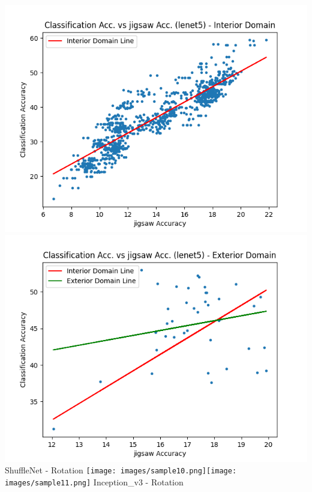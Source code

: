 \documentclass[a4paper]{article}
\begin{document}
{\begin{flushleft}
    \includegraphics[scale=0.16]{images/sample8.png}\includegraphics[scale=0.16]{images/sample9.png}
    ShuffleNet - Rotation
    \texttt{[image: images/sample10.png]}\texttt{[image: images/sample11.png]}
    Inception\_v3 - Rotation

\end{flushleft}}
\end{document}
